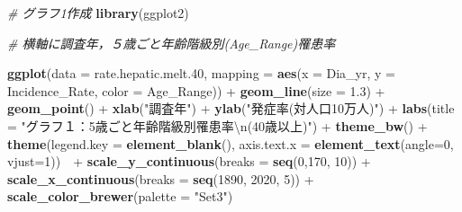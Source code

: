 \documentclass[11pt,]{article}
\newenvironment{Shaded}{\begin{snugshade}}{\end{snugshade}}
\newcommand{\KeywordTok}[1]{\textcolor[rgb]{0.13,0.29,0.53}{\textbf{{#1}}}}
\newcommand{\DataTypeTok}[1]{\textcolor[rgb]{0.13,0.29,0.53}{{#1}}}
\newcommand{\DecValTok}[1]{\textcolor[rgb]{0.00,0.00,0.81}{{#1}}}
\newcommand{\FloatTok}[1]{\textcolor[rgb]{0.00,0.00,0.81}{{#1}}}
\newcommand{\CharTok}[1]{\textcolor[rgb]{0.31,0.60,0.02}{{#1}}}
\newcommand{\StringTok}[1]{\textcolor[rgb]{0.31,0.60,0.02}{{#1}}}
\newcommand{\CommentTok}[1]{\textcolor[rgb]{0.56,0.35,0.01}{\textit{{#1}}}}
\newcommand{\NormalTok}[1]{{#1}}
\begin{document}
\begin{Shaded}
\begin{Highlighting}[]
\CommentTok{#  グラフ1作成}
\KeywordTok{library}\NormalTok{(ggplot2)}

\CommentTok{#  横軸に調査年，５歳ごと年齢階級別(Age_Range)罹患率}

\KeywordTok{ggplot}\NormalTok{(}\DataTypeTok{data =} \NormalTok{rate.hepatic.melt}\FloatTok{.40}\NormalTok{,}
       \DataTypeTok{mapping =} \KeywordTok{aes}\NormalTok{(}\DataTypeTok{x =} \NormalTok{Dia_yr, }\DataTypeTok{y =} \NormalTok{Incidence_Rate,}
                     \DataTypeTok{color =} \NormalTok{Age_Range)) +}\StringTok{ }
\StringTok{  }\KeywordTok{geom_line}\NormalTok{(}\DataTypeTok{size =} \FloatTok{1.3}\NormalTok{) +}
\StringTok{  }\KeywordTok{geom_point}\NormalTok{() +}
\StringTok{    }\KeywordTok{xlab}\NormalTok{(}\StringTok{"調査年"}\NormalTok{) +}\StringTok{ }
\StringTok{    }\KeywordTok{ylab}\NormalTok{(}\StringTok{"発症率(対人口10万人)"}\NormalTok{) +}\StringTok{ }
\StringTok{    }\KeywordTok{labs}\NormalTok{(}\DataTypeTok{title =} 
           \StringTok{"グラフ１：5歳ごと年齢階級別罹患率}\CharTok{\textbackslash{}n}\StringTok{(40歳以上)"}\NormalTok{) +}\StringTok{ }
\StringTok{    }\KeywordTok{theme_bw}\NormalTok{() +}
\StringTok{    }\KeywordTok{theme}\NormalTok{(}\DataTypeTok{legend.key =} \KeywordTok{element_blank}\NormalTok{(),}
          \DataTypeTok{axis.text.x =} \KeywordTok{element_text}\NormalTok{(}\DataTypeTok{angle=}\DecValTok{0}\NormalTok{, }\DataTypeTok{vjust=}\DecValTok{1}\NormalTok{))　+}\StringTok{ }
\StringTok{  }\KeywordTok{scale_y_continuous}\NormalTok{(}\DataTypeTok{breaks =} \KeywordTok{seq}\NormalTok{(}\DecValTok{0}\NormalTok{,}\DecValTok{170}\NormalTok{, }\DecValTok{10}\NormalTok{)) +}\StringTok{ }
\StringTok{  }\KeywordTok{scale_x_continuous}\NormalTok{(}\DataTypeTok{breaks =} \KeywordTok{seq}\NormalTok{(}\DecValTok{1890}\NormalTok{, }\DecValTok{2020}\NormalTok{, }\DecValTok{5}\NormalTok{)) +}
\StringTok{  }\KeywordTok{scale_color_brewer}\NormalTok{(}\DataTypeTok{palette =} \StringTok{"Set3"}\NormalTok{) }
\end{Highlighting}
\end{Shaded}
\end{document}

